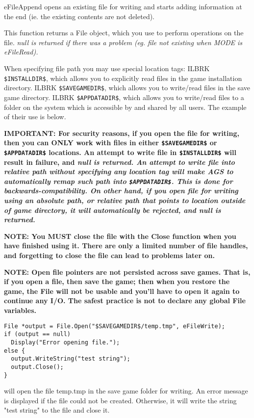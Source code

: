 eFileAppend opens an existing file for writing and starts adding information at
the end (ie. the existing contents are not deleted).

This function returns a File object, which you use to perform operations on the
file. \it{null} is returned if there was a problem (eg. file not existing when MODE
is eFileRead).

When specifying file path you may use special location tags: ILBRK
\verb^$INSTALLDIR$^, which allows you to explicitly read files in the game installation directory. ILBRK
\verb^$SAVEGAMEDIR$^, which allows you to write/read files in the save game directory. ILBRK
\verb^$APPDATADIR$^, which allows you to write/read files to a folder on the system which
is accessible by and shared by all users.
The example of their use is below.

\bf{IMPORTANT}: For security reasons, if you open the file for writing, then you can ONLY work with
files in either \verb^$SAVEGAMEDIR$^ or \verb^$APPDATADIR$^ locations.
An attempt to write file in \verb^$INSTALLDIR$^ will result in failure, and \it{null} is returned.
An attempt to write file into relative path without specifying any location tag will make AGS to automatically
remap such path into \verb^$APPDATADIR$^. This is done for backwards-compatibility.
On other hand, if you open file for writing using an absolute path, or relative path that points to location outside of game directory, it will
automatically be rejected, and \it{null} is returned.

\bf{NOTE:} You \bf{MUST} close the file with the Close function when you have finished
using it. There are only a limited number of file handles, and forgetting to
close the file can lead to problems later on.

\bf{NOTE:} Open file pointers are not persisted across save games. That is, if you open
a file, then save the game; then when you restore the game, the File will not be usable
and you'll have to open it again to continue any I/O. The safest practice is not to
declare any global File variables.

\begin{verbatim}
File *output = File.Open("$SAVEGAMEDIR$/temp.tmp", eFileWrite);
if (output == null)
  Display("Error opening file.");
else {
  output.WriteString("test string");
  output.Close();
}
\end{verbatim}
will open the file temp.tmp in the save game folder for writing. An error message is
displayed if the file could not be created. Otherwise, it will write the string "test string"
to the file and close it.

